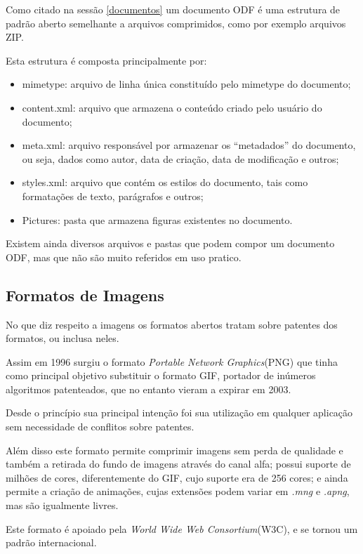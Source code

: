 Como citado na sessão \ref{documentos} um documento ODF é uma estrutura de padrão aberto semelhante a arquivos comprimidos, como por exemplo arquivos ZIP.

Esta estrutura é composta principalmente por:

\begin{itemize}
    \item{mimetype: arquivo de linha única constituído pelo mimetype do documento;}
    \item{content.xml: arquivo que armazena o conteúdo criado pelo usuário do documento;}
    \item{meta.xml: arquivo responsável por armazenar os ``metadados'' do documento, ou seja, dados como autor, data de criação, data de modificação e outros;}
    \item{styles.xml: arquivo que contém os estilos do documento, tais como formatações de texto, parágrafos e outros;}
    \item{Pictures: pasta que armazena figuras existentes no documento.}
\end{itemize}

Existem ainda diversos arquivos e pastas que podem compor um documento ODF, mas que não são muito referidos em uso pratico.


\subsection{Formatos de Imagens}

No que diz respeito a imagens os formatos abertos tratam sobre patentes dos formatos, ou inclusa neles.

Assim em 1996 surgiu o formato \textit{Portable Network Graphics}(PNG) que tinha como principal objetivo substituir o formato GIF, portador de inúmeros algoritmos patenteados, que no entanto vieram a expirar em 2003.

Desde o princípio sua principal intenção foi sua utilização em qualquer aplicação sem necessidade de conflitos sobre patentes.

Além disso este formato permite comprimir imagens sem perda de qualidade e também a retirada do fundo de imagens através do canal alfa; possui suporte de milhões de cores, diferentemente do GIF, cujo suporte era de 256 cores; e ainda permite a criação de animações, cujas extensões podem variar em \textit{.mng} e \textit{.apng}, mas são igualmente livres.

Este formato é apoiado pela \textit{World Wide Web Consortium}(W3C), e se tornou um padrão internacional.

